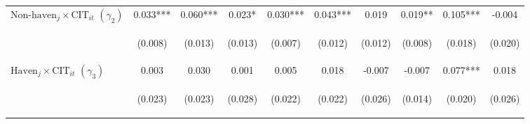 \documentclass[twoside,a4paper,11pt]{article}
\begin{document}
\begin{table}
{\begin{tabular}{lccc|ccc|ccc}
		$\text{Non-haven}_j\times\text{CIT}_{it}$ $ (\gamma_2)$ & 0.033*** & 0.060*** & 0.023* & 0.030*** & 0.043*** & 0.019 & 0.019** & 0.105*** & -0.004 \\
		\vspace{4pt} & \begin{footnotesize}(0.008)\end{footnotesize} & \begin{footnotesize}(0.013)\end{footnotesize} & \begin{footnotesize}(0.013)\end{footnotesize} & \begin{footnotesize}(0.007)\end{footnotesize} & \begin{footnotesize}(0.012)\end{footnotesize} & \begin{footnotesize}(0.012)\end{footnotesize} & \begin{footnotesize}(0.008)\end{footnotesize} & \begin{footnotesize}(0.018)\end{footnotesize} & \begin{footnotesize}(0.020)\end{footnotesize} \\
		$\text{Haven}_j\times\text{CIT}_{it}$ $ (\gamma_3)$ & 0.003 & 0.030 & 0.001 & 0.005 & 0.018 & -0.007 & -0.007 & 0.077*** & 0.018 \\
		& \begin{footnotesize}(0.023)\end{footnotesize} & \begin{footnotesize}(0.023)\end{footnotesize} & \begin{footnotesize}(0.028)\end{footnotesize} & \begin{footnotesize}(0.022)\end{footnotesize} & \begin{footnotesize}(0.022)\end{footnotesize} & \begin{footnotesize}(0.026)\end{footnotesize} & \begin{footnotesize}(0.014)\end{footnotesize} & \begin{footnotesize}(0.020)\end{footnotesize} & \begin{footnotesize}(0.026)\end{footnotesize} \\

\end{tabular}}
\end{table}
\end{document}
